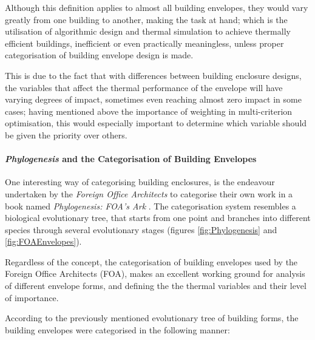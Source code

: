 Although this definition applies to almost all building envelopes, they would vary greatly from one building to another, making the task at hand; which is the utilisation of algorithmic design and thermal simulation to achieve thermally efficient buildings, inefficient or even practically meaningless, unless proper categorisation of building envelope design is made.

This is due to the fact that with differences between building enclosure designs, the variables that affect the thermal performance of the envelope will have varying degrees of impact, sometimes even reaching almost zero impact in some cases; having mentioned above the importance of weighting in multi-criterion optimisation, this would especially important to determine which variable should be given the priority over others.

\paragraph{\emph{Phylogenesis} and the Categorisation of Building Envelopes}\mbox{}

One interesting way of categorising building enclosures, is the endeavour undertaken by the \emph{Foreign Office Architects} to categorise their own work in a book named \emph{Phylogenesis: FOA's Ark} \cite{foa04}. The categorisation system resembles a biological evolutionary tree, that starts from one point and branches into different species through several evolutionary stages (figures \ref{fig:Phylogenesis} and \ref{fig:FOAEnvelopes}).

Regardless of the concept, the categorisation of building envelopes used by the Foreign Office Architects (FOA), makes an excellent working ground for analysis of different envelope forms, and defining the the thermal variables and their level of importance.

According to the previously mentioned evolutionary tree of building forms, the building envelopes were categorised in the following manner:


